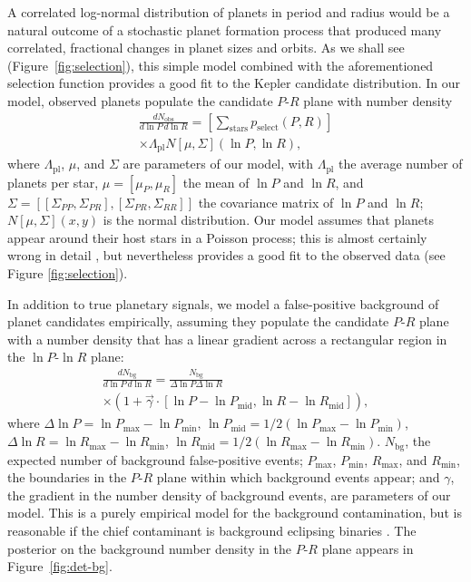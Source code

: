 \documentclass[apjl]{emulateapj}
\newcommand{\Rpl}{\Lambda_\mathrm{pl}}
\newcommand{\Nbg}{N_\mathrm{bg}}
\begin{document}
A correlated log-normal distribution of planets in period and radius
would be a natural outcome of a stochastic planet formation process
that produced many correlated, fractional changes in planet sizes and
orbits.  As we shall see (Figure\ \ref{fig:selection}), this simple
model combined with the aforementioned selection function provides a
good fit to the Kepler candidate distribution.  In our model, observed
planets populate the candidate $P$-$R$ plane with number density
\begin{multline}
  \label{eq:foreground-rate}
  \frac{dN_\mathrm{obs}}{d\ln P\, d\ln R} = \left[ \sum_\mathrm{stars}
    p_\mathrm{select}(P, R) \right] \\ \times \Rpl N\left[ \mu, \Sigma
    \right]\left( \ln P, \ln R \right),
\end{multline}
where $\Rpl$, $\mu$, and $\Sigma$ are parameters of our model, with
$\Rpl$ the average number of planets per star, $\mu = \left[ \mu_P,
  \mu_R \right]$ the mean of $\ln P$ and $\ln R$, and $\Sigma = \left[
  \left[ \Sigma_{PP}, \Sigma_{PR} \right], \left[ \Sigma_{PR},
    \Sigma_{RR} \right]\right]$ the covariance matrix of $\ln P$ and
$\ln R$; $N\left[ \mu, \Sigma \right](x,y)$ is the normal
distribution.  Our model assumes that planets appear around their host
stars in a Poisson process; this is almost certainly wrong in detail
\citep{Weissbein2012}, but nevertheless provides a good fit to the
observed data (see Figure \ref{fig:selection}).

In addition to true planetary signals, we model a false-positive
background of planet candidates empirically, assuming they populate
the candidate $P$-$R$ plane with a number density that has a linear
gradient across a rectangular region in the $\ln P$-$\ln R$ plane:
\begin{multline}
  \label{eq:background-rate}
  \frac{d\Nbg}{d \ln P \, d \ln R} = \frac{\Nbg}{\Delta \ln P \Delta
    \ln R} \\ \times \left( 1 + \vec{\gamma} \cdot \left[ \ln P - \ln P_\mathrm{mid} , \ln
    R - \ln R_\mathrm{mid} \right] \right),
\end{multline}
where $\Delta \ln P = \ln P_\mathrm{max} - \ln P_\mathrm{min}$, $\ln
P_\mathrm{mid} = 1/2\left(\ln P_\mathrm{max} - \ln P_\mathrm{min}
\right)$, $\Delta \ln R = \ln R_\mathrm{max} - \ln R_\mathrm{min}$,
$\ln R_\mathrm{mid} = 1/2\left(\ln R_\mathrm{max} - \ln R_\mathrm{min}
\right)$.  $\Nbg$, the expected number of background false-positive
events; $P_\mathrm{max}$, $P_\mathrm{min}$, $R_\mathrm{max}$, and
$R_\mathrm{min}$, the boundaries in the $P$-$R$ plane within which
background events appear; and $\gamma$, the gradient in the number
density of background events, are parameters of our model.  This is a
purely empirical model for the background contamination, but is
reasonable if the chief contaminant is background eclipsing binaries
\citep{Fressin2013,Duquennoy1991}.  The posterior on the background
number density in the $P$-$R$ plane appears in
Figure\ \ref{fig:det-bg}.
\end{document}
